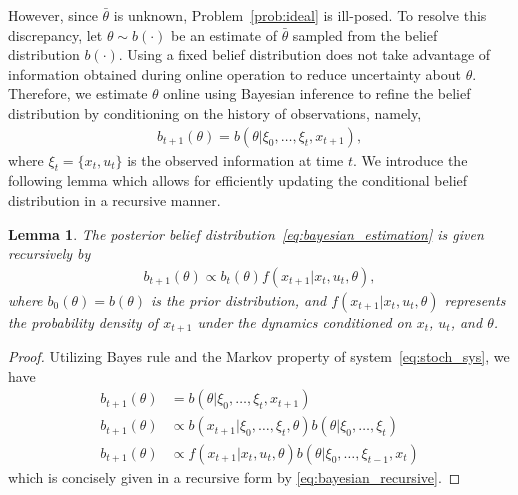 \documentclass[letterpaper, 10 pt, conference]{IEEEconf}
\newtheorem{lemma}{Lemma}
\begin{document}
However, since $\bar{\theta}$ is unknown, Problem~\eqref{prob:ideal} is ill-posed.
% 
To resolve this discrepancy, let $\theta \sim b(\cdot)$ be an estimate of $\bar{\theta}$ sampled from the belief distribution $b(\cdot)$. 
% 
Using a fixed belief distribution does not take advantage of information obtained during online operation to reduce uncertainty about $\theta$.
Therefore, we estimate $\theta$ online using Bayesian inference to refine the belief distribution by conditioning on the history of observations, namely,
\begin{align} \label{eq:bayesian_estimation}
    b_{t+1}(\theta) = b(\theta | \xi_{0}, \dots, \xi_{t}, x_{t+1}) ,
\end{align}
where $\xi_{t} = \{x_t, u_t\}$ is the observed information at time $t$.
We introduce the following lemma which allows for efficiently updating the conditional belief distribution in a recursive manner.
\begin{lemma}\label{lem:recursive_bayesian}
    The posterior belief distribution~\eqref{eq:bayesian_estimation} is given recursively by
    \begin{align} \label{eq:bayesian_recursive}
        b_{t+1}(\theta) \propto b_{t}(\theta) f(x_{t+1} | x_{t}, u_{t}, \theta),
    \end{align}
    where $b_{0}(\theta) = b(\theta)$ is the prior distribution, and $f(x_{t+1} | x_{t}, u_{t}, \theta)$ represents the probability density of $x_{t+1}$ under the dynamics conditioned on $x_{t}$, $u_{t}$, and $\theta$.
\end{lemma}
\begin{proof}
    Utilizing Bayes rule and the Markov property of system~\eqref{eq:stoch_sys}, we have 
    \begin{align*}
        b_{t+1}(\theta) &= b(\theta | \xi_{0}, \dots, \xi_{t}, x_{t+1}) \\
        b_{t+1}(\theta) &\propto b(x_{t+1} | \xi_{0}, \dots, \xi_{t}, \theta) b(\theta | \xi_{0}, \dots, \xi_{t}) \\
        b_{t+1}(\theta) &\propto f(x_{t+1} | x_{t}, u_{t}, \theta) b(\theta | \xi_{0}, \dots, \xi_{t-1}, x_{t})
    \end{align*}
    which is concisely given in a recursive form by \eqref{eq:bayesian_recursive}.
\end{proof}
\end{document}
